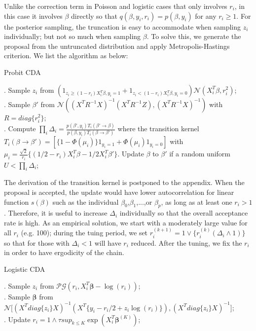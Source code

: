 \documentclass[10pt]{article}
\begin{document}
Unlike the correction term in Poisson and logistic cases that only involves $r_i$, in this case it involves $\beta$ directly so that $q(\beta, y_i, r_i)=p(\beta,y_i)$ for any $r_i \ge 1$. For the posterior sampling, the truncation is easy to accommodate when sampling $z_i$ individually; but not so much when sampling $\beta$. To solve this, we generate the proposal from the untruncated distribution and apply Metropolis-Hastings criterion. We list the algorithm as below:

\begin{algorithm}
		\caption{Probit CDA}
		\label{probit_algorithm}
		    \begin{algorithmic}

		\State {}
		. Sample $z_i$ from  $ ({1}_{z_i \ge (1-r_i)X_i^T\beta, y_i=1}+{1}_{z_i<(1-r_i)X_i^T\beta, y_i=0} )\mathcal{N}( X_i^T{\beta}, r_i^2)$;\\
		. Sample $\beta'$ from  $\mathcal{N}( (X^T R^{-1} X )^{-1}(X^T R^{-1} {Z}), (X^T R^{-1} X )^{-1})$ with $R=diag\{r^2_i\}$; \\
		. Compute $\prod_i \Delta_i=\frac{p(\beta',y_i)T_i(\beta'\rightarrow \beta)}{p(\beta,y_i)T_i(\beta\rightarrow \beta')}$ where the transition kernel $T_i(\beta \rightarrow \beta')= [ \{1- \Phi(\mu_i)\} {1}_{y_i=1}+ \Phi(\mu_i) {1}_{y_i=0} ]$ with $\mu_i = \frac{\sqrt 2}{r_i}\{    (1/2-r_i)X^T_i\beta -1/2 X^T_i\beta'\}$. Update $\beta$ to $\beta'$ if a random uniform $U< \prod_i \Delta_i$;
		\EndFor
		\end{algorithmic}
\end{algorithm}

The derivation of the transition kernel is postponed to the appendix. When the proposal is accepted, the update would have lower autocorrelation for linear function $s(\beta)$ such as the individual $\beta_0$,$\beta_1$,...,or $\beta_p$, as long as at least one $r_i > 1$. Therefore, it is useful to increase $\Delta_i$ individually so that the overall acceptance rate is high. As an empirical solution, we start with a moderately large value for all $r_i$ (e.g. 100); during the tuing period, we set $r_i^{(k+1)} = 1 \vee \{ r_i^{(k)} (\Delta_i \wedge 1)\}$ so that for those with $\Delta_i < 1$ will have $r_i$ reduced. After the tuning, we fix the $r_i$ in order to have ergodicity of the chain.



\begin{algorithm}[H]
		\caption{Logistic CDA}
		\label{logistic_algorithm}
		    \begin{algorithmic}
		\State \For{ $K=1\ldots N_{steps}$ }
		. Sample $z_i$ from   $\mathcal{PG}(r_i, X_i^T\boldsymbol\beta-\log(r_i))$; \\
		. Sample $\boldsymbol\beta$ from $\mathcal{N}\big[ (X^T diag\{z_i\} X)^{-1} (X^T  \big \{ y_i - r_i/2 + z_i \log(r_i) \big\} ),(X^T diag\{z_i\} X )^{-1} \big]$;\\
		. Update $r_i= 1 \wedge \tau sup_{k\le K}\exp(X_i^T\boldsymbol\beta^{(K)})$;\\
		\EndFor
		\end{algorithmic}
\end{algorithm}
\end{document}
